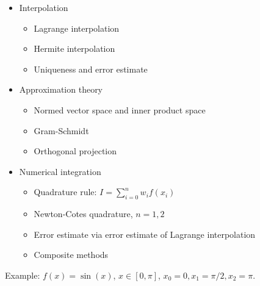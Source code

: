 \documentclass{article} %
\theoremstyle{break}
\begin{document}
   \begin{itemize}
   \item Interpolation
     \begin{itemize}
      \item Lagrange interpolation
      \item Hermite interpolation
      \item Uniqueness and error estimate
      \end{itemize}
    \item Approximation theory
      \begin{itemize}
        \item Normed vector space and inner product space
        \item Gram-Schmidt
        \item Orthogonal projection
        \end{itemize}
      \item Numerical integration
        \begin{itemize}
        \item Quadrature rule: $I=\sum_{i=0}^nw_if(x_i)$
        \item Newton-Cotes quadrature, $n=1, 2$
        \item Error estimate via error estimate of Lagrange interpolation
        \item Composite methods
        \end{itemize}
      \end{itemize}
      Example: $f(x)=\sin(x)$, $x\in [0, \pi]$, $x_0=0, x_1=\pi/2, x_2=\pi$.
\end{document}
